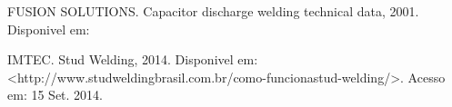 \documentclass[a4paper,12pt]{article}%
\begin{document}
\begin{enumerate}
\begin{enumerate}
		FUSION SOLUTIONS. Capacitor discharge welding technical data, 2001. Disponivel em:
		
		
		IMTEC. Stud Welding, 2014. Disponivel em: <http://www.studweldingbrasil.com.br/como-funcionastud-welding/>.
		Acesso em: 15 Set. 2014.\\
		
		\end{enumerate}
	\end{enumerate}
\end{document}
